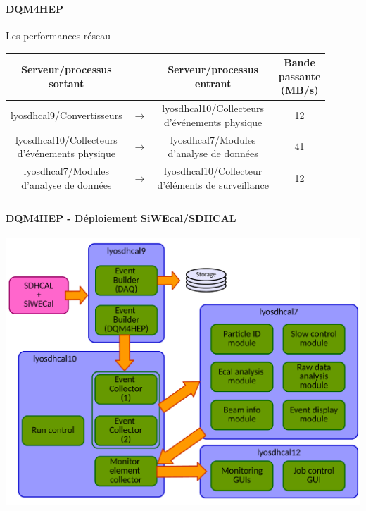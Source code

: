 \documentclass[8pt]{beamer}
\begin{document}
  \begin{frame}
  \frametitle{\backup}
  \framesubtitle{DQM4HEP}
    \begin{block}{Les performances réseau}
      \begin{table}[!h]
        \begin{center}
        \setlength\tabcolsep{10pt}
          \begin{tabular}{c c c|c}
             \makecell{Serveur/processus \\ sortant} & ~ & \makecell{Serveur/processus \\ entrant} & \makecell{Bande \\ passante \\ (MB/s)} \\
            \hline \hline
            lyosdhcal9/Convertisseurs & $\longrightarrow$ & \makecell{lyosdhcal10/Collecteurs \\ d'événements physique} & 12 \\
            \hline
            \makecell{lyosdhcal10/Collecteurs \\ d'événements physique} & $\longrightarrow$ & \makecell{lyosdhcal7/Modules \\ d'analyse de données} & 41 \\
            \hline
            \makecell{lyosdhcal7/Modules \\ d'analyse de données} & $\longrightarrow$ & \makecell{lyosdhcal10/Collecteur \\ d'éléments de surveillance} & 12
          \end{tabular}
        \end{center}
      \end{table}
    \end{block}
  \end{frame}


  \begin{frame}
  \frametitle{\backup}
  \framesubtitle{DQM4HEP - Déploiement SiWEcal/SDHCAL}
  \begin{center}
    \includegraphics[width=\linewidth]{DQMSDHCALDeployement.pdf}
  \end{center}
  \end{frame}
\end{document}
